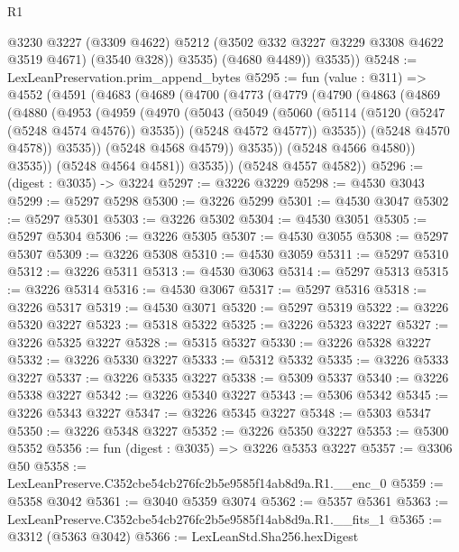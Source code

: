 \begin{lexlean}{R1}
\begin{coremodule}
              @3230
              @3227
              (@3309 @4622)
              @5212
              (@3502 @332 @3227 @3229 @3308 @4622 @3519 @4671)
              (@3540 @328))
            @3535)
          (@4680 @4489))
        @3535))
@5248 := LexLeanPreservation.prim_append_bytes
@5295 := fun (value : @311) =>
  @4552
    (@4591
      (@4683
        (@4689
          (@4700
            (@4773
              (@4779
                (@4790
                  (@4863
                    (@4869
                      (@4880
                        (@4953
                          (@4959
                            (@4970
                              (@5043
                                (@5049
                                  (@5060
                                    (@5114 (@5120 (@5247 (@5248 @4574 @4576)) @3535))
                                    (@5248 @4572 @4577))
                                  @3535))
                              (@5248 @4570 @4578))
                            @3535))
                        (@5248 @4568 @4579))
                      @3535))
                  (@5248 @4566 @4580))
                @3535))
            (@5248 @4564 @4581))
          @3535))
      (@5248 @4557 @4582))
@5296 := (digest : @3035) -> @3224
@5297 := @3226 @3229
@5298 := @4530 @3043
@5299 := @5297 @5298
@5300 := @3226 @5299
@5301 := @4530 @3047
@5302 := @5297 @5301
@5303 := @3226 @5302
@5304 := @4530 @3051
@5305 := @5297 @5304
@5306 := @3226 @5305
@5307 := @4530 @3055
@5308 := @5297 @5307
@5309 := @3226 @5308
@5310 := @4530 @3059
@5311 := @5297 @5310
@5312 := @3226 @5311
@5313 := @4530 @3063
@5314 := @5297 @5313
@5315 := @3226 @5314
@5316 := @4530 @3067
@5317 := @5297 @5316
@5318 := @3226 @5317
@5319 := @4530 @3071
@5320 := @5297 @5319
@5322 := @3226 @5320 @3227
@5323 := @5318 @5322
@5325 := @3226 @5323 @3227
@5327 := @3226 @5325 @3227
@5328 := @5315 @5327
@5330 := @3226 @5328 @3227
@5332 := @3226 @5330 @3227
@5333 := @5312 @5332
@5335 := @3226 @5333 @3227
@5337 := @3226 @5335 @3227
@5338 := @5309 @5337
@5340 := @3226 @5338 @3227
@5342 := @3226 @5340 @3227
@5343 := @5306 @5342
@5345 := @3226 @5343 @3227
@5347 := @3226 @5345 @3227
@5348 := @5303 @5347
@5350 := @3226 @5348 @3227
@5352 := @3226 @5350 @3227
@5353 := @5300 @5352
@5356 := fun (digest : @3035) => @3226 @5353 @3227
@5357 := @3306 @50
@5358 := LexLeanPreserve.C352cbe54cb276fc2b5e9585f14ab8d9a.R1.__enc_0
@5359 := @5358 @3042
@5361 := @3040 @5359 @3074
@5362 := @5357 @5361
@5363 := LexLeanPreserve.C352cbe54cb276fc2b5e9585f14ab8d9a.R1.__fits_1
@5365 := @3312 (@5363 @3042)
@5366 := LexLeanStd.Sha256.hexDigest

\end{coremodule}
\end{lexlean}
